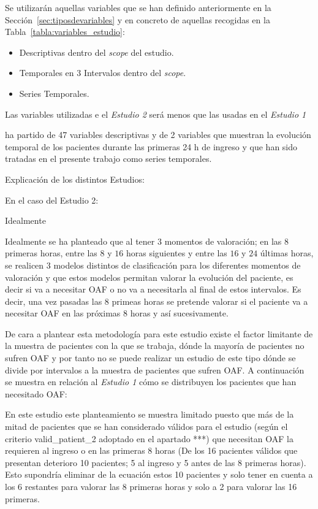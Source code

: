 Se utilizarán aquellas variables que se han definido anteriormente en la Sección~\ref{sec:tiposdevariables} y en concreto de aquellas recogidas en la Tabla~\ref{tabla:variables_estudio}:

\begin{itemize}
    \item Descriptivas dentro del \textit{scope} del estudio.
    \item Temporales en $3$ Intervalos dentro del \textit{scope}.
    \item Series Temporales.
\end{itemize}

Las variables utilizadas e el \textit{Estudio 2} será menos que las usadas en el \textit{Estudio 1}

ha partido de 47 variables descriptivas y de 2 variables que muestran la evolución temporal de los pacientes durante las primeras 24 h de ingreso y que han sido tratadas en el presente trabajo como series temporales. 


Explicación de los distintos Estudios:


En el caso del Estudio 2:

Idealmente 

Idealmente se ha planteado que al tener 3 momentos de valoración; en las $8$ primeras horas, entre las $8$ y $16$ horas siguientes y entre las $16$ y $24$ últimas horas, se realicen $3$ modelos distintos de clasificación para los diferentes momentos de valoración y que estos modelos permitan valorar la evolución del paciente, es decir si va a necesitar OAF o no va a necesitarla al final de estos intervalos. Es decir, una vez pasadas las $8$ primeas horas se pretende valorar si el paciente va a necesitar OAF en las próximas $8$ horas y así sucesivamente. 

De cara a plantear esta metodología para este estudio existe el factor limitante de la muestra de pacientes con la que se trabaja, dónde la mayoría de pacientes no sufren OAF y por tanto no se puede realizar un estudio de este tipo dónde se divide por intervalos a la muestra de pacientes que sufren OAF. A continuación se muestra en relación al \textit{Estudio 1} cómo se distribuyen los pacientes que han necesitado OAF:

En este estudio este planteamiento se muestra limitado puesto que más de la mitad de pacientes que se han considerado válidos para el estudio (según el criterio valid\_patient\_2 adoptado en el apartado ***) que necesitan OAF la requieren al ingreso o en las primeras 8 horas (De los 16 pacientes válidos que presentan deterioro 10 pacientes; 5 al ingreso y 5 antes de las 8 primeras horas). Esto supondría eliminar de la ecuación estos 10 pacientes y solo tener en cuenta a los 6 restantes para valorar las 8 primeras horas y solo a 2 para valorar las 16 primeras.


